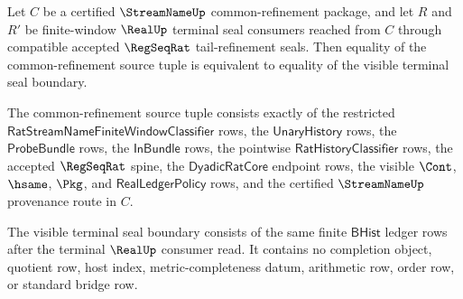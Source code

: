 \begin{theorem}
\label{thm:streamname-realup-common-refinement-seal-pullback}
Let $C$ be a certified $\StreamNameUp$ common-refinement package, and let
$R$ and $R'$ be finite-window $\RealUp$ terminal seal consumers reached from
$C$ through compatible accepted $\RegSeqRat$ tail-refinement seals. Then
equality of the common-refinement source tuple is equivalent to equality of the
visible terminal seal boundary.

The common-refinement source tuple consists exactly of the restricted
$\mathsf{RatStreamNameFiniteWindowClassifier}$ rows, the $\mathsf{UnaryHistory}$
rows, the $\mathsf{ProbeBundle}$ rows, the $\mathsf{InBundle}$ rows, the
pointwise $\mathsf{RatHistoryClassifier}$ rows, the accepted $\RegSeqRat$
spine, the $\mathsf{DyadicRatCore}$ endpoint rows, the visible $\Cont$,
$\hsame$, $\Pkg$, and $\mathsf{RealLedgerPolicy}$ rows, and the certified
$\StreamNameUp$ provenance route in $C$.

The visible terminal seal boundary consists of the same finite
$\mathsf{BHist}$ ledger rows after the terminal $\RealUp$ consumer read. It
contains no completion object, quotient row, host index, metric-completeness
datum, arithmetic row, order row, or standard bridge row.
\end{theorem}
